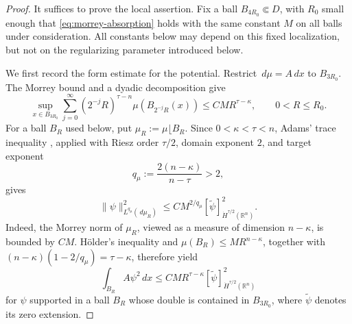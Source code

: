 \documentclass[11pt,reqno]{amsart}
\numberwithin{equation}{section}
\newcommand{\R}{\mathbb R}
\newcommand{\dd}{\,d}
\theoremstyle{remark}
\begin{document}
\begin{proof}
It suffices to prove the local assertion.  Fix a ball
\(B_{4R_0}\Subset D\), with \(R_0\) small enough that
\eqref{eq:morrey-absorption} holds with the same constant \(M\) on all
balls under consideration.  All constants below may depend on this
fixed localization, but not on the regularizing parameter introduced
below.

We first record the form estimate for the potential.  Restrict
\(\dd\mu=A\dd x\) to \(B_{3R_0}\).  The Morrey bound and a dyadic
decomposition give
\begin{equation}
 \sup_{x\in B_{3R_0}}
 \sum_{j=0}^{\infty}(2^{-j}R)^{\tau-n}
 \mu(B_{2^{-j}R}(x))
 \le CMR^{\tau-\kappa},
 \qquad 0<R\le R_0.
 \label{eq:morrey-to-kato}
\end{equation}
For a ball \(B_R\) used below, put
\(\mu_R:=\mu\lfloor B_R\).  Since \(0<\kappa<\tau<n\), Adams' trace
inequality \cite{AdamsTrace}, applied with Riesz order \(\tau/2\),
domain exponent \(2\), and target exponent
\[
 q_\mu:=\frac{2(n-\kappa)}{n-\tau}>2,
\]
gives
\[
 \|\psi\|_{L^{q_\mu}(\dd\mu_R)}^2
 \le CM^{2/q_\mu}
 [\widetilde\psi]_{\dot H^{\tau/2}(\R^n)}^2.
\]
Indeed, the Morrey norm of \(\mu_R\), viewed as a measure of dimension
\(n-\kappa\), is bounded by \(CM\).  H\"older's inequality and
\(\mu(B_R)\le MR^{n-\kappa}\), together with
\((n-\kappa)(1-2/q_\mu)=\tau-\kappa\), therefore yield
\begin{equation}
 \int_{B_R}A\psi^2\dd x
 \le CMR^{\tau-\kappa}
 [\widetilde\psi]_{\dot H^{\tau/2}(\R^n)}^2
 \label{eq:kato-form-bound}
\end{equation}
for \(\psi\) supported in a ball \(B_R\) whose double is contained in
\(B_{3R_0}\), where \(\widetilde\psi\) denotes its zero extension.


\end{proof}
\end{document}
